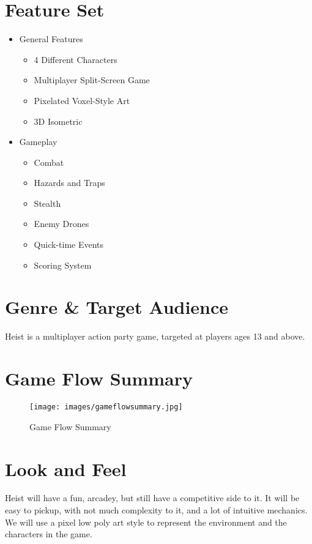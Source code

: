 \documentclass[11pt]{report}
\begin{document}
\section{Feature Set}

\begin{itemize}
    \item General Features
    \begin{itemize}
        \item 4 Different Characters
        \item Multiplayer Split-Screen Game
        \item Pixelated Voxel-Style Art
        \item 3D Isometric
    \end{itemize}
    \item Gameplay
    \begin{itemize}
        \item Combat
        \item Hazards and Traps
        \item Stealth
        \item Enemy Drones
        \item Quick-time Events
        \item Scoring System
    \end{itemize}
\end{itemize}

\section{Genre \& Target Audience}
Heist is a multiplayer action party game, targeted at players ages 13 and above.

\section{Game Flow Summary}

\begin{figure}[H]
	\texttt{[image: images/gameflowsummary.jpg]}
	\caption{Game Flow Summary}
\end{figure}

\section{Look and Feel}

Heist will have a fun, arcadey, but still have a competitive side to it. It will be easy to pickup, with not much complexity to it, and a lot of intuitive mechanics. We will use a pixel low poly art style to represent the environment and the characters in the game.
\end{document}
